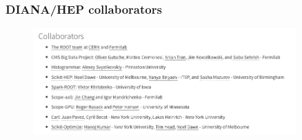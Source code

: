 \begin{frame}
\frametitle{DIANA/HEP collaborators}

\begin{figure}[htbp]
\begin{center}
\includegraphics[width=0.9\textwidth]{images/20170110-diana-collaborators.png}
\end{center}
\end{figure}

\end{frame}


